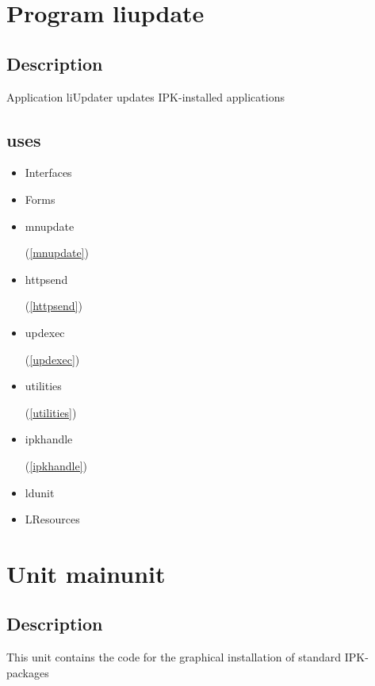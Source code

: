 \documentclass{report}
\begin{document}
\chapter{Program liupdate}
\label{liupdate}
\section{Description}
Application liUpdater updates IPK{-}installed applications
\section{uses}
\begin{itemize}
\item \begin{ttfamily}Interfaces\end{ttfamily}\item \begin{ttfamily}Forms\end{ttfamily}\item \begin{ttfamily}mnupdate\end{ttfamily}(\ref{mnupdate})\item \begin{ttfamily}httpsend\end{ttfamily}(\ref{httpsend})\item \begin{ttfamily}updexec\end{ttfamily}(\ref{updexec})\item \begin{ttfamily}utilities\end{ttfamily}(\ref{utilities})\item \begin{ttfamily}ipkhandle\end{ttfamily}(\ref{ipkhandle})\item \begin{ttfamily}ldunit\end{ttfamily}\item \begin{ttfamily}LResources\end{ttfamily}\end{itemize}
\chapter{Unit mainunit}
\label{mainunit}
\section{Description}
This unit contains the code for the graphical installation of standard IPK{-}packages
\end{document}
